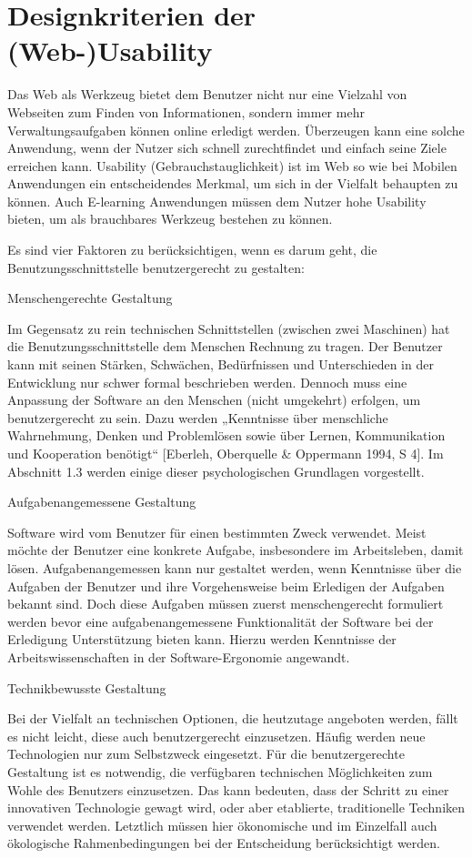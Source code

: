 \documentclass[a4paper, 12pt, twoside, BCOR=20mm, DIV=calc, abstracton, parskip=half*, toc=bibliography, toc=listof, headsepline, footsepline, headings=small, numbers=enddot]{scrreprt}
\begin{document}
		
		\section{Designkriterien der (Web-)Usability}
	Das Web als Werkzeug bietet dem Benutzer nicht nur eine Vielzahl von Webseiten zum Finden von Informationen, sondern immer mehr Verwaltungsaufgaben können online erledigt werden. Überzeugen kann eine solche Anwendung, wenn der Nutzer sich schnell zurechtfindet und einfach seine Ziele erreichen kann. Usability (Gebrauchstauglichkeit) ist im Web so wie bei Mobilen Anwendungen ein entscheidendes Merkmal, um sich in der Vielfalt behaupten zu können. Auch E-learning Anwendungen müssen dem Nutzer hohe Usability bieten, um als brauchbares Werkzeug bestehen zu können.\newline
				
	
		Es sind vier Faktoren zu berücksichtigen, wenn es darum geht, die Benutzungsschnittstelle benutzergerecht zu gestalten:
		
		Menschengerechte Gestaltung
		
		Im Gegensatz zu rein technischen Schnittstellen (zwischen zwei Maschinen) hat die Benutzungsschnittstelle dem Menschen Rechnung zu tragen. Der Benutzer kann mit seinen Stärken, Schwächen, Bedürfnissen und Unterschieden in der Entwicklung nur schwer formal beschrieben werden. Dennoch muss eine Anpassung der Software an den Menschen (nicht umgekehrt) erfolgen, um benutzergerecht zu sein. Dazu werden „Kenntnisse über menschliche Wahrnehmung, Denken und Problemlösen sowie über Lernen, Kommunikation und Kooperation benötigt“ [Eberleh, Oberquelle \& Oppermann 1994, S 4]. Im Abschnitt 1.3 werden einige dieser psychologischen Grundlagen vorgestellt.
		
		Aufgabenangemessene Gestaltung
		
		Software wird vom Benutzer für einen bestimmten Zweck verwendet. Meist möchte der Benutzer eine konkrete Aufgabe, insbesondere im Arbeitsleben, damit lösen. Aufgabenangemessen kann nur gestaltet werden, wenn Kenntnisse über die Aufgaben der Benutzer und ihre Vorgehensweise beim Erledigen der Aufgaben bekannt sind. Doch diese Aufgaben müssen zuerst menschengerecht formuliert werden bevor eine aufgabenangemessene Funktionalität der Software bei der Erledigung Unterstützung bieten kann. Hierzu werden Kenntnisse der Arbeitswissenschaften in der Software-Ergonomie angewandt.
		
		Technikbewusste Gestaltung
		
		Bei der Vielfalt an technischen Optionen, die heutzutage angeboten werden, fällt es nicht leicht, diese auch benutzergerecht einzusetzen. Häufig werden neue Technologien nur zum Selbstzweck eingesetzt. Für die benutzergerechte Gestaltung ist es notwendig, die verfügbaren technischen Möglichkeiten zum Wohle des Benutzers einzusetzen. Das kann bedeuten, dass der Schritt zu einer innovativen Technologie gewagt wird, oder aber etablierte, traditionelle Techniken verwendet werden. Letztlich müssen hier ökonomische und im Einzelfall auch ökologische Rahmenbedingungen bei der Entscheidung berücksichtigt werden.
		
\end{document}
